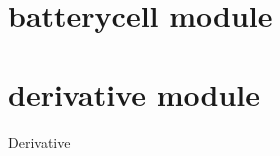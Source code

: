 \documentclass[letterpaper,10pt,english]{sphinxmanual}
\begin{document}
\section{batterycell module}
\label{\detokenize{batterycell:batterycell-module}}\label{\detokenize{batterycell::doc}}

\section{derivative module}
\label{\detokenize{derivative:module-derivative}}\label{\detokenize{derivative:derivative-module}}\label{\detokenize{derivative::doc}}
\sphinxAtStartPar
Derivative
\end{document}
